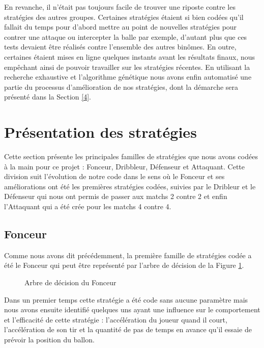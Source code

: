 \documentclass[a4paper,12pt]{article}
\numberwithin{equation}{section}
\begin{document}
En revanche, il n’était pas toujours facile de trouver une riposte contre les stratégies des autres groupes. Certaines stratégies étaient si bien codées qu’il fallait du temps pour d’abord mettre au point de nouvelles stratégies pour contrer une attaque ou intercepter la balle par exemple, d’autant plus que ces tests devaient être réalisés contre l’ensemble des autres binômes. En outre, certaines étaient mises en ligne quelques instants avant les résultats finaux, nous empêchant ainsi de pouvoir travailler sur les stratégies récentes. En utilisant la recherche exhaustive et l'algorithme génétique nous avons enfin automatisé une partie du processus d’amélioration de nos stratégies, dont la démarche sera présenté dans la Section \ref{4}.

\section{Présentation des stratégies}

Cette section présente les principales \og familles \fg{} de stratégies que nous avons codées à la main pour ce projet : Fonceur, Dribbleur, Défenseur et Attaquant. Cette division suit l'évolution de notre code dans le sens où le Fonceur et ses améliorations ont été les premières stratégies codées, suivies par le Dribleur et le Défenseur qui nous ont permis de passer aux matchs 2 contre 2 et enfin l'Attaquant qui a été crée pour les matchs 4 contre 4.   

\subsection{Fonceur}

Comme nous avons dit précédemment, la première famille de stratégies codée a été le Fonceur qui peut être représenté par l'arbre de décision de la Figure \ref{Figure1}.

\begin{figure}[ht]
\centering

\caption{Arbre de décision du Fonceur}
\label{Figure1}
\end{figure}

Dans un premier temps cette stratégie a été code sans aucune paramètre mais nous avons ensuite identifié quelques uns ayant une influence sur le comportement et l’efficacité de cette stratégie : l’accélération du joueur quand il court, l'accélération de son tir et la quantité de pas de temps en avance qu'il essaie de prévoir la position du ballon.
\end{document}
